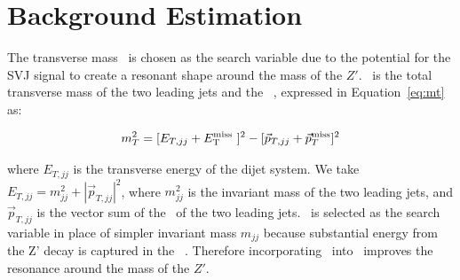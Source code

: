 \section{Background Estimation}
\label{sec:background}


The transverse mass \mt~is chosen as the search variable due to the potential for the SVJ signal to create a resonant shape around the mass of the $Z'$. \mt~is the total transverse mass of the two leading jets and the \met~, expressed in Equation~\ref{eq:mt} as:

\begin{equation}
m_T^2 = [E_{T,jj} + E_{\text{T}}^{\text{miss}}~]^2 - [\vec{p}_{T,jj} + \vec{p}_T^{\text{miss}}]^2
\label{eq:mt}
\end{equation}

where $E_{T,jj}$ is the transverse energy of the dijet system. We take $E_{T,jj} = m_{jj}^2 + |\vec{p}_{T,jj}|^2$, where $m_{jj}^2$ is the invariant mass of the two leading jets, and $\vec{p}_{T,jj}$ is the vector sum of the \pt~of the two leading jets. \mt~is selected as the search variable in place of simpler invariant mass $m_{jj}$ because substantial energy from the Z' decay is captured in the \met~. Therefore incorporating \met~into \mt~improves the resonance around the mass of the $Z'$. \par

